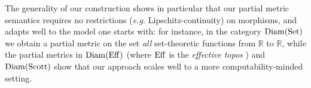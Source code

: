 The generality of our construction shows in particular that our partial metric semantics requires no restrictions (\textit{e.g.} Lipschitz-continuity) on morphisms, and adapts well to the model one starts with: for instance, in the category $\operatorname{Diam}(\operatorname{Set})$ we obtain a partial metric on the set \emph{all}  set-theoretic functions from $\mathbb R$ to $\mathbb R$, while the partial metrics in $\operatorname{Diam}(\operatorname{Eff})$ (where $\operatorname{Eff}$ is the \emph{effective topos} \cite{hyland:effective-topos}) and $\operatorname{Diam}(\operatorname{Scott})$ show that our approach scales well to a more computability-minded setting.




%
%
%      
%
%

